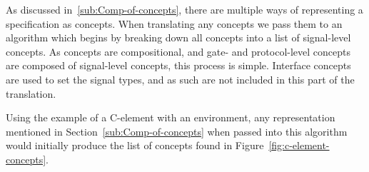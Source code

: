 \documentclass[british,compsoc]{IEEEtran}
\begin{document}
As discussed in~\ref{sub:Comp-of-concepts}, there are multiple ways of representing a specification as concepts.
When translating any concepts we pass them to an algorithm which begins by breaking down all concepts into a list of
signal-level concepts. As concepts are compositional, and gate- and protocol-level concepts are composed of signal-level concepts, this process is simple.
Interface concepts are used to set the signal types, and as such are not included in this part of the translation.

Using the example of a C-element with an environment, any representation mentioned in Section~\ref{sub:Comp-of-concepts} when passed into this
algorithm would initially produce the list of concepts
found in Figure~\ref{fig:c-element-concepts}.

\end{document}
